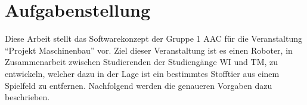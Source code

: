 \section{Aufgabenstellung}\label{sec:task}

Diese Arbeit stellt das Softwarekonzept der Gruppe 1 \ac{AAC} für die Veranstaltung \enquote{Projekt Maschinenbau} vor.
Ziel dieser Veranstaltung ist es einen Roboter, in Zusammenarbeit zwischen Studierenden der Studiengänge \ac{WI} und \ac{TM}, zu entwickeln, welcher dazu in der Lage ist ein bestimmtes Stofftier aus einem Spielfeld zu entfernen.
Nachfolgend werden die genaueren Vorgaben dazu beschrieben.


